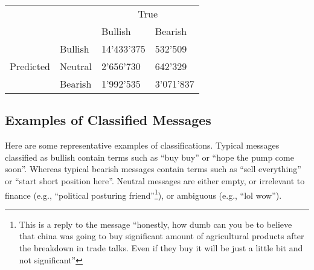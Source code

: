 \begin{table}[H]
\centering
\begin{tabular}{cl|ll|}
\cline{3-4}
\multicolumn{1}{l}{}                        &         & \multicolumn{2}{c|}{True}               \\ \cline{3-4}
\multicolumn{1}{l}{}                        &         & \multicolumn{1}{l|}{Bullish} & Bearish   \\ \cline{1-4}
\multicolumn{1}{|c|}{\multirow{3}{*}{Predicted}} & Bullish &  14'433'375                            & 532'509    \\ \cline{2-2}
\multicolumn{1}{|c|}{}                      & Neutral &  2'656'730                            &  642'329  \\ \cline{2-2}
\multicolumn{1}{|c|}{}                      & Bearish &  1'992'535                            &  3'071'837 \\ \cline{1-4}
\end{tabular}
\label{classif-in}
\end{table}




 
 
\subsection{Examples of Classified Messages}\label{app_exampleclass}

Here are some representative examples of classifications. Typical messages classified as bullish contain terms such as “buy buy” or “hope the pump come soon”. Whereas typical bearish messages contain terms such as “sell everything” or “start short position here”. Neutral messages are either empty, or irrelevant to finance (e.g., ``political posturing friend''\footnote{This is a reply to the message ``honestly, how dumb can you be to believe that china was going to buy significant amount of agricultural products after the breakdown in trade talks. Even if they buy it will be just a little bit and not significant''}), or ambiguous (e.g., “lol wow”).

